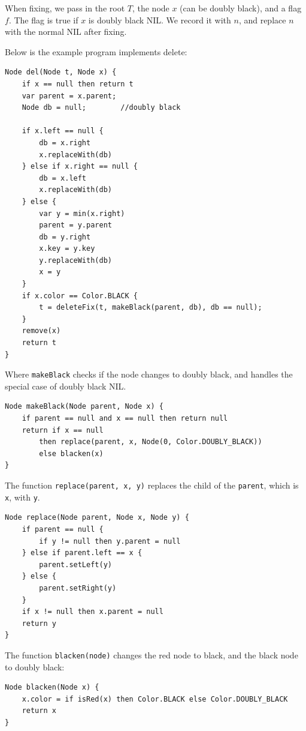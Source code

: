 \documentclass[b5paper]{article}
\begin{document}
When fixing, we pass in the root $T$, the node $x$ (can be doubly black), and a flag $f$. The flag is true if $x$ is doubly black NIL. We record it with $n$, and replace $n$ with the normal NIL after fixing.

Below is the example program implements delete:

\begin{lstlisting}[language = Bourbaki]
Node del(Node t, Node x) {
    if x == null then return t
    var parent = x.parent;
    Node db = null;        //doubly black

    if x.left == null {
        db = x.right
        x.replaceWith(db)
    } else if x.right == null {
        db = x.left
        x.replaceWith(db)
    } else {
        var y = min(x.right)
        parent = y.parent
        db = y.right
        x.key = y.key
        y.replaceWith(db)
        x = y
    }
    if x.color == Color.BLACK {
        t = deleteFix(t, makeBlack(parent, db), db == null);
    }
    remove(x)
    return t
}
\end{lstlisting}

Where \texttt{makeBlack} checks if the node changes to doubly black, and handles the special case of doubly black NIL.

\begin{lstlisting}[language = Bourbaki]
Node makeBlack(Node parent, Node x) {
    if parent == null and x == null then return null
    return if x == null
        then replace(parent, x, Node(0, Color.DOUBLY_BLACK))
        else blacken(x)
}
\end{lstlisting}

The function \texttt{replace(parent, x, y)} replaces the child of the \texttt{parent}, which is \texttt{x}, with \texttt{y}.

\begin{lstlisting}[language = Bourbaki]
Node replace(Node parent, Node x, Node y) {
    if parent == null {
        if y != null then y.parent = null
    } else if parent.left == x {
        parent.setLeft(y)
    } else {
        parent.setRight(y)
    }
    if x != null then x.parent = null
    return y
}
\end{lstlisting}

The function \texttt{blacken(node)} changes the red node to black, and the black node to doubly black:

\begin{lstlisting}[language = Bourbaki]
Node blacken(Node x) {
    x.color = if isRed(x) then Color.BLACK else Color.DOUBLY_BLACK
    return x
}
\end{lstlisting}
\end{document}
